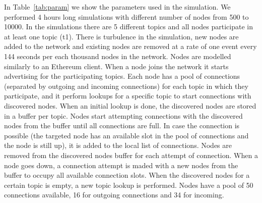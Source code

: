 In Table~\ref{tab:param} we show the parameters used in the simulation. 
We performed 4 hours long simulations with different number of nodes from 500 to 10000.
In the simulations there are 5 different topics and all nodes participate in at least one topic (t1).
There is turbulence in the simulation,  \ie new nodes are added to the network and existing nodes are removed at a rate of one event every 144 seconds per each thousand nodes in the network.
Nodes are modelled similarly to an Ethereum client. 
When a node joins the network it starts advertising for the participating topics.
Each node has a pool of connections (separated by outgoing and incoming connections) for each topic in which they participate, and it perform lookups
for a specific topic to start connections with discovered nodes.
When an initial lookup is done,  the discovered nodes are stored in a buffer per topic.
Nodes start attempting connections with the discovered nodes from the buffer until all connections  are full.
In case the connection is possible (the targeted node has an available slot in the pool of connections and the node is still up), it is added 
to the local list of connections.
Nodes are removed from the discovered nodes buffer for each attempt of connection.
When a node goes down, a connection attempt is maded with a new nodes from the buffer to occupy all available connection slots.
When the discovered nodes for a certain topic is empty, a new topic lookup is performed.
Nodes have a pool of 50 connections available, 16 for outgoing connections and 34 for incoming.



